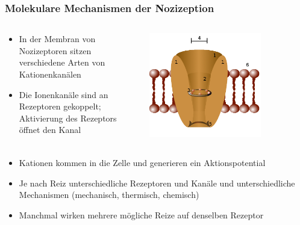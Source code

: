 \documentclass{beamer}
\begin{document}
\begin{frame}
\frametitle{Molekulare Mechanismen der Nozizeption}

\begin{columns}[c]

\begin{column}{7cm}
\begin{itemize}
\item
In der Membran von Nozizeptoren sitzen verschiedene Arten von Kationenkanälen 
\item
Die Ionenkanäle sind an Rezeptoren gekoppelt; Aktivierung des Rezeptors öffnet den Kanal
\end{itemize}



\end{column}

\begin{column}{5cm}
\begin{center}
\includegraphics[width=0.7\textwidth]{Ion_channel.png}
\end{center}
\end{column}

\end{columns}

\begin{itemize}
\item
Kationen kommen in die Zelle und generieren ein Aktionspotential 
\item
Je nach Reiz unterschiedliche Rezeptoren und Kanäle und unterschiedliche Mechanismen (mechanisch, thermisch, chemisch)
\item
Manchmal wirken mehrere mögliche Reize auf denselben Rezeptor
\end{itemize}


\end{frame}
\end{document}
